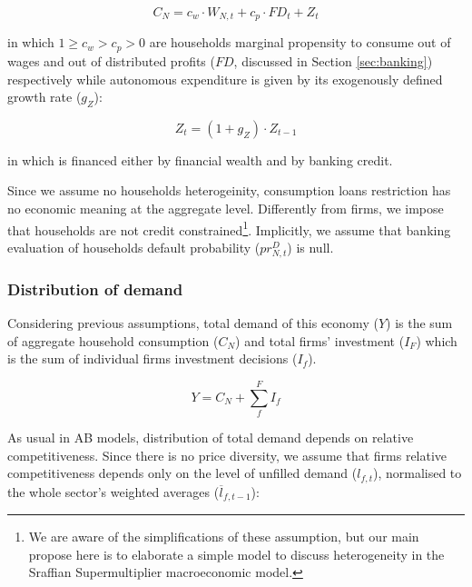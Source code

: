 \documentclass{SelfArx}
\begin{document}
\begin{latex}
\begin{equation}
C_{N} = c_{w}\cdot W_{N,t} + c_{p}\cdot FD_{t} + Z_{t}
\end{equation}
\end{latex}
in which \(1 \geq c_{w} > c_{p} > 0\) are households marginal propensity to consume out of wages and out of distributed profits (\(FD\), discussed in Section \ref{sec:banking}) respectively while autonomous expenditure is given by its exogenously defined growth rate (\(g_{Z}\)):
\begin{latex}
\begin{equation}
Z_{t} = (1+g_{Z})\cdot Z_{t-1}
\end{equation}
\end{latex}
in which is financed either by financial wealth and by banking credit.

Since we assume no households heterogeinity, consumption loans restriction has no economic meaning at the aggregate level.
Differently from firms, we impose that households are not credit constrained\footnote{We are aware of the simplifications of these assumption, but our main propose here is to elaborate a simple model to discuss heterogeneity in the Sraffian Supermultiplier macroeconomic model.}.
Implicitly, we assume that banking evaluation of households default probability (\(pr^{D}_{N,t}\)) is null.

\subsubsection{Distribution of demand}
\label{sec:org5b02830}


Considering previous assumptions, total demand of this economy (\(Y\)) is the sum of aggregate household consumption (\(C_{N}\)) and total firms' investment (\(I_{F}\)) which is the sum of individual firms investment decisions (\(I_{f}\)).
\begin{latex}
\begin{equation}
\label{Ch_super_EQ_GDP_D}
Y = C_{N} + \sum_{f}^{F} I_{f}
\end{equation}
\end{latex}
As usual in AB models, distribution of total demand depends on relative competitiveness.
Since there is no price diversity, we assume that firms relative competitiveness depends only on the level of unfilled demand (\(l_{f,t}\)), normalised to the whole sector’s weighted averages (\(\overline{l}_{f,t-1}\)):
\end{document}

